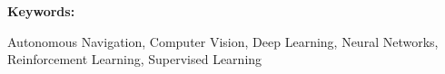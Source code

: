 
\textbf{Keywords:}

 Autonomous Navigation, Computer Vision, Deep Learning, Neural Networks,
 Reinforcement Learning, Supervised Learning
